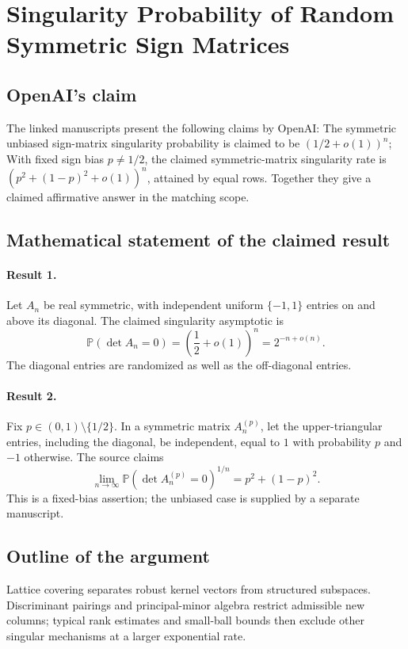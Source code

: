 \documentclass[11pt]{article}
\begin{document}
\section*{Singularity Probability of Random Symmetric Sign Matrices}

\subsection{OpenAI's claim}
The linked manuscripts present the following claims by OpenAI: The symmetric unbiased sign-matrix singularity probability is claimed to be $(1/2+o(1))^n$; With fixed sign bias $p\ne1/2$, the claimed symmetric-matrix singularity rate is $(p^2+(1-p)^2+o(1))^n$, attained by equal rows. Together they give a claimed affirmative answer in the matching scope.

\subsection{Mathematical statement of the claimed result}
\paragraph{Result 1.} Let \(A_n\) be real symmetric, with independent uniform \(\{-1,1\}\) entries on and above its diagonal. The claimed singularity asymptotic is
\[
 \mathbb P(\det A_n=0)=\left(\frac12+o(1)\right)^n=2^{-n+o(n)}.
\]
The diagonal entries are randomized as well as the off-diagonal entries.

\paragraph{Result 2.} Fix \(p\in(0,1)\setminus\{1/2\}\). In a symmetric matrix \(A_n^{(p)}\), let the upper-triangular entries, including the diagonal, be independent, equal to \(1\) with probability \(p\) and \(-1\) otherwise. The source claims
\[
 \lim_{n\to\infty}\mathbb P(\det A_n^{(p)}=0)^{1/n}=p^2+(1-p)^2.
\]
This is a fixed-bias assertion; the unbiased case is supplied by a separate manuscript.

\subsection{Outline of the argument}
Lattice covering separates robust kernel vectors from structured subspaces. Discriminant pairings and principal-minor algebra restrict admissible new columns; typical rank estimates and small-ball bounds then exclude other singular mechanisms at a larger exponential rate.
\end{document}
